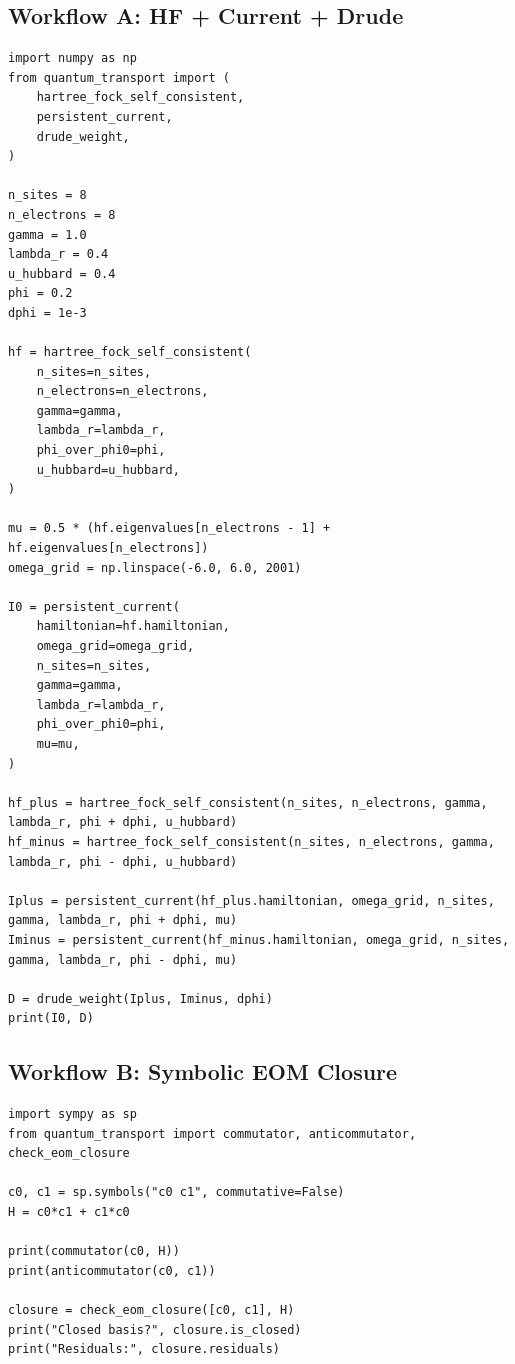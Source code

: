 \documentclass[11pt,a4paper]{article}
\begin{document}
\subsection{Workflow A: HF + Current + Drude}
\begin{lstlisting}[style=py]
import numpy as np
from quantum_transport import (
    hartree_fock_self_consistent,
    persistent_current,
    drude_weight,
)

n_sites = 8
n_electrons = 8
gamma = 1.0
lambda_r = 0.4
u_hubbard = 0.4
phi = 0.2
dphi = 1e-3

hf = hartree_fock_self_consistent(
    n_sites=n_sites,
    n_electrons=n_electrons,
    gamma=gamma,
    lambda_r=lambda_r,
    phi_over_phi0=phi,
    u_hubbard=u_hubbard,
)

mu = 0.5 * (hf.eigenvalues[n_electrons - 1] + hf.eigenvalues[n_electrons])
omega_grid = np.linspace(-6.0, 6.0, 2001)

I0 = persistent_current(
    hamiltonian=hf.hamiltonian,
    omega_grid=omega_grid,
    n_sites=n_sites,
    gamma=gamma,
    lambda_r=lambda_r,
    phi_over_phi0=phi,
    mu=mu,
)

hf_plus = hartree_fock_self_consistent(n_sites, n_electrons, gamma, lambda_r, phi + dphi, u_hubbard)
hf_minus = hartree_fock_self_consistent(n_sites, n_electrons, gamma, lambda_r, phi - dphi, u_hubbard)

Iplus = persistent_current(hf_plus.hamiltonian, omega_grid, n_sites, gamma, lambda_r, phi + dphi, mu)
Iminus = persistent_current(hf_minus.hamiltonian, omega_grid, n_sites, gamma, lambda_r, phi - dphi, mu)

D = drude_weight(Iplus, Iminus, dphi)
print(I0, D)
\end{lstlisting}

\subsection{Workflow B: Symbolic EOM Closure}
\begin{lstlisting}[style=py]
import sympy as sp
from quantum_transport import commutator, anticommutator, check_eom_closure

c0, c1 = sp.symbols("c0 c1", commutative=False)
H = c0*c1 + c1*c0

print(commutator(c0, H))
print(anticommutator(c0, c1))

closure = check_eom_closure([c0, c1], H)
print("Closed basis?", closure.is_closed)
print("Residuals:", closure.residuals)
\end{lstlisting}
\end{document}
